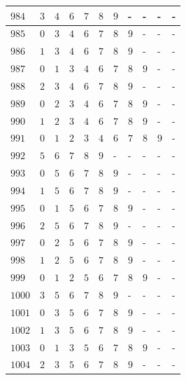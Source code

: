 \begin{appendices}
\begin{table}[H]
\begin{tabular} {|l|l|l|l|l|l|l|l|l|l|l|}
  		$ 984 $ & $ 3 $ &$ 4 $ &$ 6 $ &$ 7 $ &$ 8 $ &$ 9 $ & - &  - &  - &  -   \\ \hline
  		$ 985 $ & $ 0 $ &$ 3 $ &$ 4 $ &$ 6 $ &$ 7 $ &$ 8 $ &$ 9 $ & - &  - &  -   \\ \hline
  		$ 986 $ & $ 1 $ &$ 3 $ &$ 4 $ &$ 6 $ &$ 7 $ &$ 8 $ &$ 9 $ & - &  - &  -   \\ \hline
  		$ 987 $ & $ 0 $ &$ 1 $ &$ 3 $ &$ 4 $ &$ 6 $ &$ 7 $ &$ 8 $ &$ 9 $ & - &  -   \\ \hline
  		$ 988 $ & $ 2 $ &$ 3 $ &$ 4 $ &$ 6 $ &$ 7 $ &$ 8 $ &$ 9 $ & - &  - &  -   \\ \hline
  		$ 989 $ & $ 0 $ &$ 2 $ &$ 3 $ &$ 4 $ &$ 6 $ &$ 7 $ &$ 8 $ &$ 9 $ & - &  -   \\ \hline
  		$ 990 $ & $ 1 $ &$ 2 $ &$ 3 $ &$ 4 $ &$ 6 $ &$ 7 $ &$ 8 $ &$ 9 $ & - &  -   \\ \hline
  		$ 991 $ & $ 0 $ &$ 1 $ &$ 2 $ &$ 3 $ &$ 4 $ &$ 6 $ &$ 7 $ &$ 8 $ &$ 9 $ & -   \\ \hline
  		$ 992 $ & $ 5 $ &$ 6 $ &$ 7 $ &$ 8 $ &$ 9 $ & - &  - &  - &  - &  -   \\ \hline
  		$ 993 $ & $ 0 $ &$ 5 $ &$ 6 $ &$ 7 $ &$ 8 $ &$ 9 $ & - &  - &  - &  -   \\ \hline
  		$ 994 $ & $ 1 $ &$ 5 $ &$ 6 $ &$ 7 $ &$ 8 $ &$ 9 $ & - &  - &  - &  -   \\ \hline
  		$ 995 $ & $ 0 $ &$ 1 $ &$ 5 $ &$ 6 $ &$ 7 $ &$ 8 $ &$ 9 $ & - &  - &  -   \\ \hline
  		$ 996 $ & $ 2 $ &$ 5 $ &$ 6 $ &$ 7 $ &$ 8 $ &$ 9 $ & - &  - &  - &  -   \\ \hline
  		$ 997 $ & $ 0 $ &$ 2 $ &$ 5 $ &$ 6 $ &$ 7 $ &$ 8 $ &$ 9 $ & - &  - &  -   \\ \hline
  		$ 998 $ & $ 1 $ &$ 2 $ &$ 5 $ &$ 6 $ &$ 7 $ &$ 8 $ &$ 9 $ & - &  - &  -   \\ \hline
  		$ 999 $ & $ 0 $ &$ 1 $ &$ 2 $ &$ 5 $ &$ 6 $ &$ 7 $ &$ 8 $ &$ 9 $ & - &  -   \\ \hline
  		$ 1000 $ & $ 3 $ &$ 5 $ &$ 6 $ &$ 7 $ &$ 8 $ &$ 9 $ & - &  - &  - &  -   \\ \hline
  		$ 1001 $ & $ 0 $ &$ 3 $ &$ 5 $ &$ 6 $ &$ 7 $ &$ 8 $ &$ 9 $ & - &  - &  -   \\ \hline
  		$ 1002 $ & $ 1 $ &$ 3 $ &$ 5 $ &$ 6 $ &$ 7 $ &$ 8 $ &$ 9 $ & - &  - &  -   \\ \hline
  		$ 1003 $ & $ 0 $ &$ 1 $ &$ 3 $ &$ 5 $ &$ 6 $ &$ 7 $ &$ 8 $ &$ 9 $ & - &  -   \\ \hline
  		$ 1004 $ & $ 2 $ &$ 3 $ &$ 5 $ &$ 6 $ &$ 7 $ &$ 8 $ &$ 9 $ & - &  - &  -   \\ \hline

\end{tabular}
\end{table}
\end{appendices}
